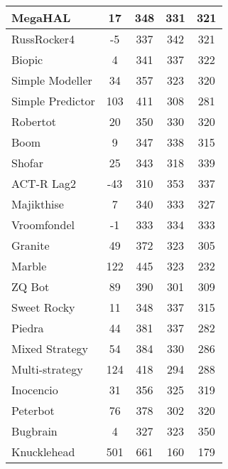 \begin{table}
\begin{tabular}{|l|c|c|c|c|}
MegaHAL & 17 & 348 & 331 & 321 \\ \hline 
RussRocker4 & -5 & 337 & 342 & 321 \\ \hline 
Biopic & 4 & 341 & 337 & 322 \\ \hline 
Simple Modeller & 34 & 357 & 323 & 320 \\ \hline 
\rowcolor{HighlightRowColor} Simple Predictor & 103 & 411 & 308 & 281 \\ \hline 
Robertot & 20 & 350 & 330 & 320 \\ \hline 
Boom & 9 & 347 & 338 & 315 \\ \hline 
Shofar & 25 & 343 & 318 & 339 \\ \hline 
ACT-R Lag2 & -43 & 310 & 353 & 337 \\ \hline 
Majikthise & 7 & 340 & 333 & 327 \\ \hline 
Vroomfondel & -1 & 333 & 334 & 333 \\ \hline 
Granite & 49 & 372 & 323 & 305 \\ \hline 
\rowcolor{HighlightRowColor} Marble & 122 & 445 & 323 & 232 \\ \hline 
\rowcolor{HighlightRowColor} ZQ Bot & 89 & 390 & 301 & 309 \\ \hline 
Sweet Rocky & 11 & 348 & 337 & 315 \\ \hline 
Piedra & 44 & 381 & 337 & 282 \\ \hline 
\rowcolor{HighlightRowColor} Mixed Strategy & 54 & 384 & 330 & 286 \\ \hline 
\rowcolor{HighlightRowColor} Multi-strategy & 124 & 418 & 294 & 288 \\ \hline 
Inocencio & 31 & 356 & 325 & 319 \\ \hline 
\rowcolor{HighlightRowColor} Peterbot & 76 & 378 & 302 & 320 \\ \hline 
Bugbrain & 4 & 327 & 323 & 350 \\ \hline 
\rowcolor{HighlightRowColor} Knucklehead & 501 & 661 & 160 & 179 \\ \hline
        \end{tabular}
    \end{table}